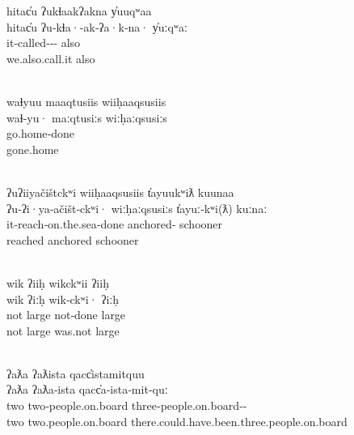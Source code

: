\begin{exe}
  \glllll hitac̓u      ʔukɬaakʔakna                          y̓uuqʷaa\\
  hitac̓u      ʔu‑kɬa·‑ak‑ʔa·k‑na·                   y̓uːqʷaː\\
     it‑called‑‑‑ also\\
     we.also.call.it                       also\\
  { }                                      \\
  \vfix

  \glllll waɬyuu       maaqtusiis  wiiḥaaqsusiis\\
  waɬ‑yu·      maːqtusiːs  wiːḥaːqsusiːs\\
  go.home‑done    \\
  gone.home       \\
          { }\\
  \vfix

  \glllll ʔuʔiiyačištckʷi          wiiḥaaqsusiis t̓ayuukʷiƛ         kuunaa\\
  ʔu‑ʔi·ya‑ačišt‑ckʷi·     wiːḥaːqsusiːs t̓ayuː‑kʷi(ƛ)      kuːnaː\\
  it‑reach‑on.the.sea‑done      anchored‑ schooner\\
  reached                       anchored          schooner\\
                                 \\
  \vfix

  \glllll wik       ʔiiḥ      wikckʷii  ʔiiḥ\\
  wik       ʔiːḥ      wik‑ckʷi· ʔiːḥ\\
  not       large     not‑done  large\\
  not       large     was.not   large\\
     \\
  \vfix

  \glllll ʔaƛa      ʔaƛista             qacc̓istamitquu\\
  ʔaƛa      ʔaƛa‑ista           qacc̓a‑ista‑mit‑quː\\
  two       two‑people.on.board three‑people.on.board‑‑\\
  two       two.people.on.board there.could.have.been.three.people.on.board\\
               \\
  \vfix


\end{exe}
